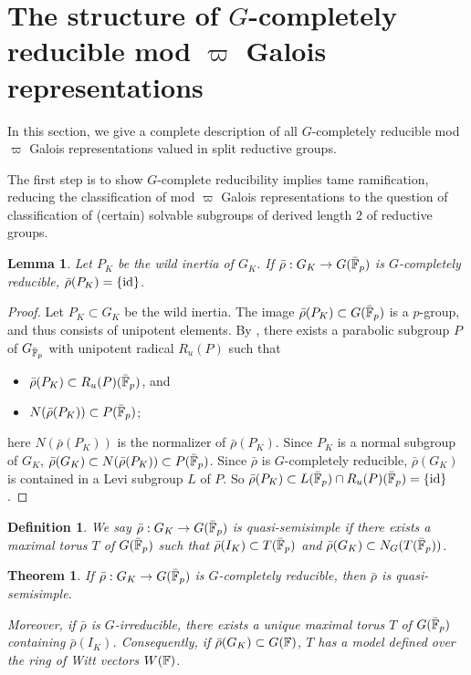 \documentclass[10pt,a4paper,twoside]{article}
\newtheorem{lem}{Lemma}
\newtheorem{thm}{Theorem}
\newtheorem{dfn}{Definition}
\begin{document}
 
\section{The structure of $G$-completely reducible mod $\varpi$ Galois representations}



In this section, we give a complete description of all 
$G$-completely reducible mod $\varpi$ Galois representations
valued in split reductive groups.


The first step is to show $G$-complete reducibility implies tame ramification,
reducing the classification of mod $\varpi$ Galois representations
to the question of classification of (certain) solvable subgroups of derived length $2$ of reductive groups.



\begin{lem}
\label{lem:trivial-wild-inertia}
Let $P_K$ be the wild inertia of $G_K$.
If $\bar\rho:G_K\to G(\bar{\mathbb{F}}_p)$ is $G$-completely reducible, $\bar\rho(P_K) = \{\operatorname{id}\}$.
\end{lem}

\begin{proof}
Let $P_K\subset G_K$ be the wild inertia.
The image $\bar\rho(P_K) \subset G(\bar{\mathbb{F}}_p)$ is a $p$-group, and thus consists of unipotent elements.
By \cite[Corollaire 3.9]{BT71}, there exists a parabolic subgroup $P$ of $G_{\bar{\mathbb{F}}_p}$ with unipotent radical $R_u(P)$
such that
\begin{itemize}
\item $\bar\rho(P_K)\subset R_u(P)(\bar{\mathbb{F}}_p)$, and
\item $N(\bar\rho(P_K))\subset P(\bar{\mathbb{F}}_p)$;
\end{itemize}
here $N(\bar\rho(P_K))$ is the normalizer of $\bar\rho(P_K)$.
Since $P_K$ is a normal subgroup of $G_K$, $\bar\rho(G_K)\subset N(\bar\rho(P_K))\subset P(\bar{\mathbb{F}}_p)$.
Since $\bar\rho$ is $G$-completely reducible, $\bar\rho(G_K)$ is contained in a Levi subgroup $L$ of $P$.
So $\bar\rho(P_K) \subset L(\bar{{\mathbb{F}}}_p) \cap R_u(P)(\bar{\mathbb{F}}_p) = \{\operatorname{id}\}$.
\end{proof}


\begin{dfn}
\label{dfn:strongly-semisimple}
We say $\bar\rho: G_K \to G(\bar{\mathbb{F}}_p)$ is \textit{quasi-semisimple}
if there exists a maximal torus $T$ of $G(\bar{\mathbb{F}}_p)$ such that
$\bar\rho(I_K) \subset T(\bar{\mathbb{F}}_p)$ and
$\bar\rho(G_K) \subset N_G(T(\bar{\mathbb{F}}_p))$.
\end{dfn}


\begin{thm}
\label{thm:strongly-semisimple}
If $\bar\rho: G_K \to G(\bar{\mathbb{F}}_p)$
is $G$-completely reducible, 
then $\bar\rho$ is quasi-semisimple.

Moreover, if $\bar\rho$ is $G$-irreducible,
there exists a \textit{unique} maximal torus $T$ of $G(\bar{\mathbb{F}}_p)$ containing $\bar\rho(I_K)$.
Consequently, if $\bar\rho(G_K)\subset G({\mathbb{F}})$,
$T$ has a model defined over the ring of Witt vectors $W({\mathbb{F}})$.
\end{thm}
\end{document}
